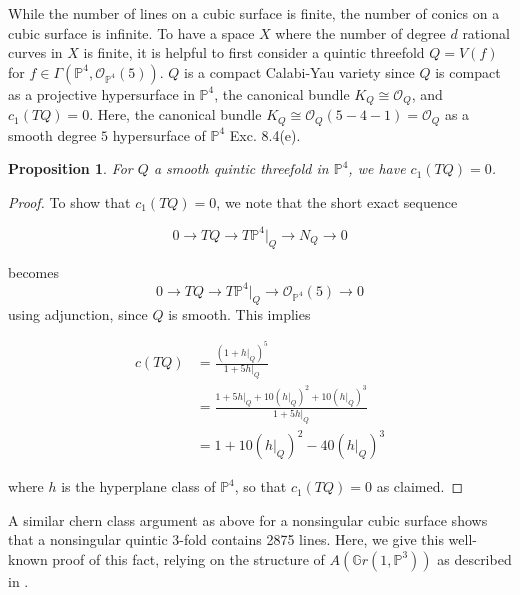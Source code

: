 \documentclass{amsart}
\newtheorem{proposition}[theorem]{Proposition}
\newcommand{\PP}{\mathbb{P}}\newcommand{\A}{\mathbb{A}}\newcommand{\Z}{\mathbb{Z}}\newcommand{\C}{\mathbb{C}}\newcommand{\N}{\mathbb{N}}\newcommand{\T}{\mathbb{T}}
\begin{document}
While the number of lines on a cubic surface is finite, the number of conics on a cubic surface is infinite. To have a space $X$ where the number of degree $d$ rational curves in $X$ is finite, it is helpful to first consider a quintic threefold $Q=V(f)$ for $f\in \Gamma(\PP^4, \mathcal{O}_{\PP^4}(5))$. $Q$ is a compact Calabi-Yau variety since $Q$ is compact as a projective hypersurface in $\PP^4$, the canonical bundle $K_Q \cong \mathcal{O}_Q$, and $c_1(TQ)=0$. Here, the canonical bundle $K_Q \cong \mathcal{O}_Q(5 - 4 - 1)=\mathcal{O}_Q$ as a smooth degree $5$ hypersurface of $\PP^4$ \cite{hartshorne} Exc. 8.4(e).\\

\begin{proposition} For $Q$ a smooth quintic threefold in $\PP^4$, we have $c_1(TQ)=0$. 
    
\end{proposition}

\begin{proof} 
To show that $c_1(TQ)=0$, we note that the short exact sequence

\[ 0 \rightarrow TQ \rightarrow T\PP^4\bigg|_Q \rightarrow N_Q \rightarrow 0 \] 

becomes \[ 0 \rightarrow TQ \rightarrow T\PP^4\bigg|_Q \rightarrow \mathcal{O}_{\PP^4}(5) \rightarrow 0 \] using adjunction, since $Q$ is smooth. This implies

\begin{align*}
    c(TQ) &= \frac{(1+h\bigg|_Q)^5}{1+5h\bigg|_Q}\\
    &= \frac{1 + 5h\bigg|_Q + 10 (h\bigg|_Q)^2 + 10 (h\bigg|_Q)^3 }{1 + 5h\bigg|_Q}\\
    &= 1 + 10(h\bigg|_Q)^2 - 40 (h\bigg|_Q)^3
\end{align*}

where $h$ is the hyperplane class of $\PP^4$, so that $c_1(TQ)=0$ as claimed. \end{proof} 




A similar chern class argument as above for a nonsingular cubic surface shows that a nonsingular quintic 3-fold contains 2875 lines. Here, we give this well-known proof of this fact, relying on the structure of $A( \mathbb{G}r(1, \mathbb{P}^3))$ as described in \cite{eisenbud20163264}.
\end{document}
